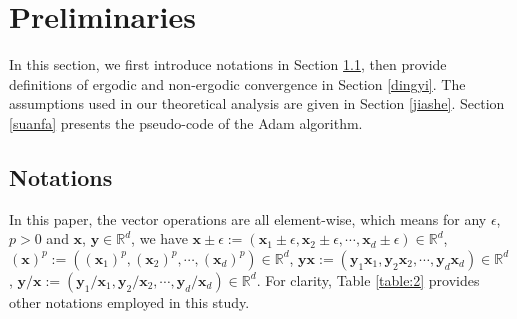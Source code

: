 \documentclass[twoside,11pt]{article}
\begin{document}
\section{Preliminaries}\label{Prelim}
In this section, we first introduce notations in Section \ref{fuhao},  then provide definitions of ergodic and non-ergodic convergence in Section \ref{dingyi}. The assumptions used in our theoretical analysis are given in Section \ref{jiashe}. Section \ref{suanfa} presents the pseudo-code of the Adam algorithm.
\subsection{Notations}\label{fuhao}
In this paper, the vector operations are all element-wise, which means for any $\epsilon$, $p>0$ and $\mathbf{x}$, $\mathbf{y}\in\mathbb{R}^d$, we have  $\mathbf{x}\pm\epsilon:=(\mathbf{x}_1\pm\epsilon,\mathbf{x}_2\pm\epsilon,\cdots,\mathbf{x}_d\pm\epsilon)\in\mathbb{R}^d$, $(\mathbf{x})^p:=((\mathbf{x}_1)^p,(\mathbf{x}_2)^p,\cdots ,(\mathbf{x}_d)^p)\in\mathbb{R}^d$, 
$\mathbf{y}\mathbf{x}:=(\mathbf{y}_1\mathbf{x}_1,\mathbf{y}_2\mathbf{x}_2,\cdots,\mathbf{y}_d\mathbf{x}_d)\in\mathbb{R}^d$, $\mathbf{y}/\mathbf{x}:=(\mathbf{y}_1/\mathbf{x}_1,\mathbf{y}_2/\mathbf{x}_2,\cdots,\mathbf{y}_d/\mathbf{x}_d)\in\mathbb{R}^d$. For clarity, Table \ref{table:2} provides other notations employed in this study.
\renewcommand{\arraystretch}{1.2}
\end{document}
